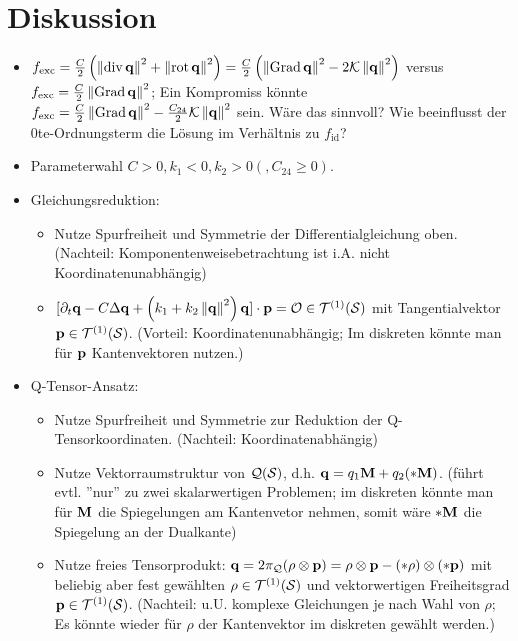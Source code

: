 \documentclass[a4paper,11pt]{scrartcl}
\newcommand{\qspace}{\mathcal{Q}(\surf)}
\newcommand{\qs}{\mathcal{Q}}
\newcommand{\fid}{f_{\text{id}}}
\newcommand{\fexc}{f_{\text{exc}}}
\begin{document}
\section{Diskussion}
\begin{itemize}
  \item \( \fexc = \frac{C}{2}\left( \left\| \div\qb \right\|^{2} + \left\| \rot\qb \right\|^{2} \right) 
        =  \frac{C}{2}\left( \left\| \Grad\qb \right\|^{2} - 2\mathcal{K}\left\| \qb \right\|^{2} \right)\)
        versus \( \fexc = \frac{C}{2}\left\| \Grad\qb \right\|^{2} \);
        Ein Kompromiss könnte \( \fexc = \frac{C}{2}\left\| \Grad\qb \right\|^{2} - \frac{C_{24}}{2}\mathcal{K}\left\| \qb \right\|^{2} \)
        sein. Wäre das sinnvoll? Wie beeinflusst der 0te-Ordnungsterm die Lösung im Verhältnis zu \( \fid \)?
  \item Parameterwahl \( C>0,k_{1}<0,k_{2}>0(,C_{24}\ge 0) \). 
  \item Gleichungsreduktion:
        \begin{itemize}
          \item Nutze Spurfreiheit und Symmetrie der Differentialgleichung oben. 
                (Nachteil: Komponentenweisebetrachtung ist i.A. nicht Koordinatenunabhängig)
          \item \( [\partial_{t}\mathbf{q} - C\Delta\mathbf{q} + \left( k_{1} + k_{2}\left\| \mathbf{q} \right\|^{2} \right)\mathbf{q}]\cdot\mathbf{p} 
                = \mathcal{O}\in\mathcal{T}^{(1)}(\mathcal{S}) \) mit Tangentialvektor \( \mathbf{p}\in\mathcal{T}^{(1)}(\mathcal{S}) \).
                (Vorteil: Koordinatenunabhängig; Im diskreten könnte man für \( \mathbf{p} \) Kantenvektoren nutzen.)
        \end{itemize}
  \item Q-Tensor-Ansatz:
      \begin{itemize}
        \item  Nutze Spurfreiheit und Symmetrie zur Reduktion der Q-Tensorkoordinaten.
              (Nachteil: Koordinatenabhängig)
        \item Nutze Vektorraumstruktur von \( \qspace \),
              d.h. \( \mathbf{q} = q_{1}\mathbf{M} + q_{2}(*\mathbf{M}) \).
              (führt evtl. ''nur'' zu zwei skalarwertigen Problemen; 
                im diskreten könnte man für \( \mathbf{M} \) die Spiegelungen am Kantenvetor nehmen,
                somit wäre \( *\mathbf{M} \) die Spiegelung an der Dualkante)
        \item Nutze freies Tensorprodukt: \( \qb=2\pi_{\qs}(\rho\otimes\pb)= \rho\otimes\pb -  (*\rho)\otimes(*\pb)\)
              mit beliebig aber fest gewählten \( \rho\in\mathcal{T}^{(1)}(\mathcal{S}) \) und vektorwertigen Freiheitsgrad \(
              \mathbf{p}\in\mathcal{T}^{(1)}(\mathcal{S}) \).
              (Nachteil: u.U. komplexe Gleichungen je nach Wahl von \( \rho \);
                Es könnte wieder für \( \rho \) der Kantenvektor im diskreten gewählt werden.)
      \end{itemize}
\end{itemize}
\end{document}
